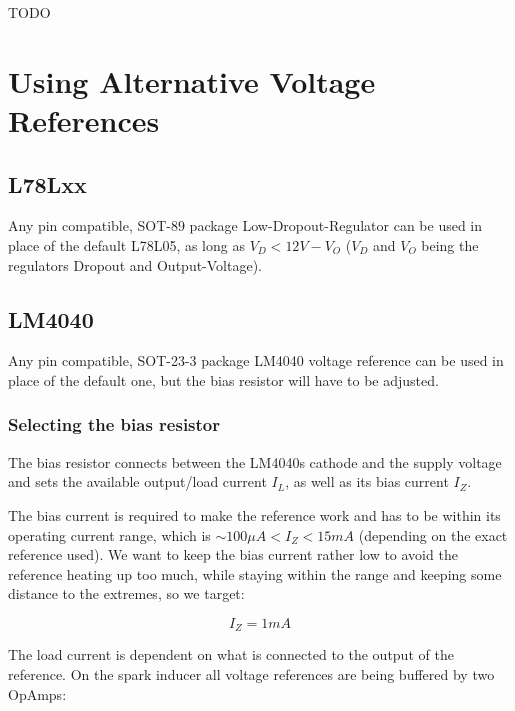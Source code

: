 \documentclass[12pt, a4paper]{article}
\begin{document}
TODO

\section*{Using Alternative Voltage References}

\subsection*{L78Lxx}

Any pin compatible, SOT-89 package Low-Dropout-Regulator can be used in place of the
default L78L05, as long as \enspace $V_D < 12V - V_O$ \enspace ($V_D$ and $V_O$ being the
regulators Dropout and Output-Voltage).

\subsection*{LM4040}

Any pin compatible, SOT-23-3 package LM4040 voltage reference can be used in place of the
default one, but the bias resistor will have to be adjusted.

\subsubsection*{Selecting the bias resistor}
\label{ssec:lm4040_selecting_bias_resistor}

The bias resistor connects between the LM4040s cathode and the supply voltage and sets the
available output/load current $I_L$, as well as its bias current $I_Z$.

The bias current is required to make the reference work and has to be within its operating
current range, which is \enspace $\sim \!\! 100\mu A < I_Z < 15mA $ \enspace
(depending on the exact reference used). We want to keep the bias current rather low to avoid
the reference heating up too much, while staying within the range and keeping some distance to
the extremes, so we target:

\[ I_Z = 1mA \tag*{$(a)$}\label{tag:a} \]

The load current is dependent on what is connected to the output of the reference. On the
spark inducer all voltage references are being buffered by two OpAmps:
\end{document}
